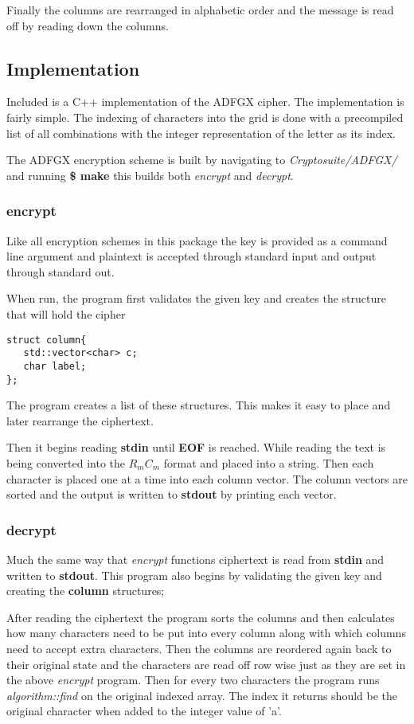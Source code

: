 Finally the columns are rearranged in alphabetic order and the message is read off by reading down the columns.

\subsection{ Implementation }

Included is a C++ implementation of the ADFGX cipher.
The implementation is fairly simple. 
The indexing of characters into the grid is done with a precompiled list of all combinations with the integer representation of the letter as its index.

The ADFGX encryption scheme is built by navigating to \textit{Cryptosuite/ADFGX/} and running \textbf{\$ make} this builds both \textit{encrypt} and \textit{decrypt}.

\subsubsection{encrypt}

Like all encryption schemes in this package the key is provided as a command line argument and plaintext is accepted through standard input and output through standard out. 

When run, the program first validates the given key and creates the structure that will hold the cipher

\begin{verbatim}
struct column{
   std::vector<char> c;
   char label;
};
\end{verbatim}

The program creates a list of these structures. This makes it easy to place and later rearrange the ciphertext.

Then it begins reading \textbf{stdin} until \textbf{EOF} is reached.
While reading the text is being converted into the $R_mC_m$ format and placed into a string.
Then each character is placed one at a time into each column vector. The column vectors are sorted and the output is written to \textbf{stdout} by printing each vector.

\subsubsection{decrypt}

Much the same way that \textit{encrypt} functions ciphertext is read from \textbf{stdin} and written to \textbf{stdout}.
This program also begins by validating the given key and creating the \textbf{column} structures;

After reading the ciphertext the program sorts the columns and then calculates how many characters need to be put into every column along with which columns need to accept extra characters.
Then the columns are reordered again back to their original state and the characters are read off row wise just as they are set in the above \textit{encrypt} program.
Then for every two characters the program runs \textit{algorithm::find} on the original indexed array. The index it returns should be the original character when added to the integer value of 'a'.
